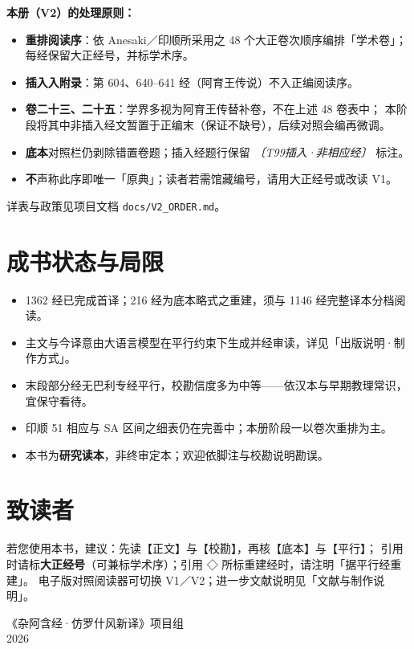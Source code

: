 \textbf{本册（V2）的处理原则：}
\begin{itemize}
  \item \textbf{重排阅读序}：依 Anesaki／印顺所采用之 48 个大正卷次顺序编排「学术卷」；
    每经保留大正经号，并标学术序。
  \item \textbf{插入入附录}：第 604、640--641 经（阿育王传说）不入正编阅读序。
  \item \textbf{卷二十三、二十五}：学界多视为阿育王传替补卷，不在上述 48 卷表中；
    本阶段将其中非插入经文暂置于正编末（保证不缺号），后续对照会编再微调。
  \item \textbf{底本}对照栏仍剥除错置卷题；插入经题行保留
    \textit{〔T99插入·非相应经〕} 标注。
  \item \textbf{不}声称此序即唯一「原典」；读者若需馆藏编号，请用大正经号或改读 V1。
\end{itemize}

\noindent 详表与政策见项目文档 \texttt{docs/V2\_ORDER.md}。

\section*{成书状态与局限}

\begin{itemize}
  \item 1362 经已完成首译；216 经为底本略式之重建，须与 1146 经完整译本分档阅读。
  \item 主文与今译意由大语言模型在平行约束下生成并经审读，详见「出版说明·制作方式」。
  \item 末段部分经无巴利专经平行，校勘信度多为中等——依汉本与早期教理常识，宜保守看待。
  \item 印顺 51 相应与 SA 区间之细表仍在完善中；本册阶段一以卷次重排为主。
  \item 本书为\textbf{研究读本}，非终审定本；欢迎依脚注与校勘说明勘误。
\end{itemize}

\section*{致读者}

若您使用本书，建议：先读【正文】与【校勘】，再核【底本】与【平行】；
引用时请标\textbf{大正经号}（可兼标学术序）；引用 ◇ 所标重建经时，请注明「据平行经重建」。
电子版对照阅读器可切换 V1／V2；进一步文献说明见「文献与制作说明」。

\vfill
\begin{flushright}
《杂阿含经·仿罗什风新译》项目组\\
2026
\end{flushright}

\clearpage
